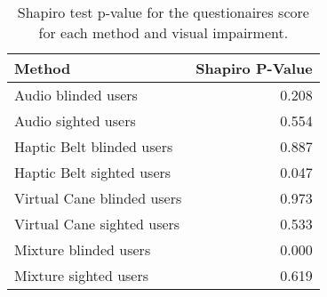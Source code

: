 
\begin{table}[!htb]
\centering
\caption{Shapiro test p-value for the questionaires score for each method and visual impairment.}
\label{tab:shapiro_questionaires}
\begin{tabular}{lr}
\toprule
                    Method &  Shapiro P-Value \\
\midrule
       Audio blinded users &            0.208 \\
       Audio sighted users &            0.554 \\
 Haptic Belt blinded users &            0.887 \\
 Haptic Belt sighted users &            0.047 \\
Virtual Cane blinded users &            0.973 \\
Virtual Cane sighted users &            0.533 \\
     Mixture blinded users &            0.000 \\
     Mixture sighted users &            0.619 \\
\bottomrule
\end{tabular}
\end{table}

